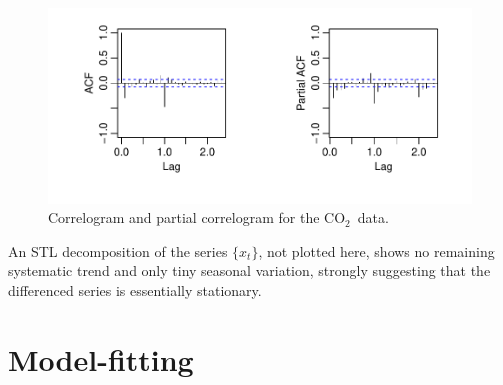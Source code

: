 \documentclass[a4paper,11pt]{article}\usepackage[]{graphicx}\usepackage[]{color}
\makeatletter
\def\maxwidth{ %
  \ifdim\Gin@nat@width>\linewidth
    \linewidth
  \else
    \Gin@nat@width
  \fi
}
\newenvironment{knitrout}{}{} %
\def\CO{{CO$_{2}$}}
\makeatother
\begin{document}
\begin{figure}[ht!]
\begin{center}
\begin{knitrout}
\color{fgcolor}
\includegraphics[width=\maxwidth]{figure/CO2-diff-1} 

\end{knitrout}
\end{center}
\caption{Correlogram and partial correlogram for the \CO\ data.}
\label{diff.fig}
\end{figure}

An STL decomposition of the series $\{x_t\}$, not plotted here, shows no remaining systematic trend and only tiny seasonal variation, strongly suggesting that the  differenced series is essentially stationary.



\section{Model-fitting}
\end{document}
